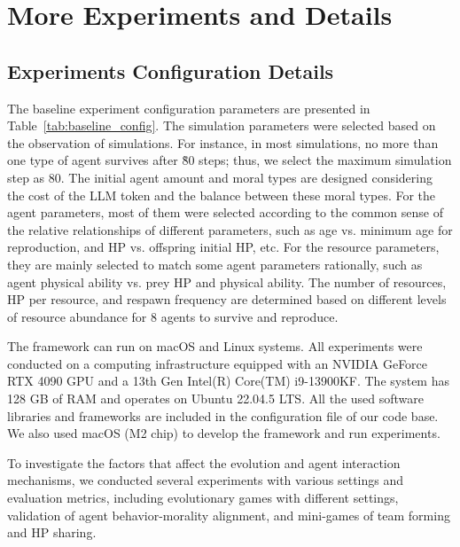 \section{More Experiments and Details}

\subsection{Experiments Configuration Details}

The baseline experiment configuration parameters are presented in Table~\ref{tab:baseline_config}. The simulation parameters were selected based on the observation of simulations. For instance, in most simulations, no more than one type of agent survives after \~80 steps; thus, we select the maximum simulation step as 80. The initial agent amount and moral types are designed considering the cost of the LLM token and the balance between these moral types. For the agent parameters, most of them were selected according to the common sense of the relative relationships of different parameters, such as age vs. minimum age for reproduction, and HP vs. offspring initial HP, etc. For the resource parameters, they are mainly selected to match some agent parameters rationally, such as agent physical ability vs. prey HP and physical ability. The number of resources, HP per resource, and respawn frequency are determined based on different levels of resource abundance for 8 agents to survive and reproduce.

The framework can run on macOS and Linux systems. All experiments were conducted on a computing infrastructure equipped with an NVIDIA GeForce RTX 4090 GPU and a 13th Gen Intel(R) Core(TM) i9-13900KF. The system has 128 GB of RAM and operates on Ubuntu 22.04.5 LTS. All the used software libraries and frameworks are included in the configuration file of our code base. We also used macOS (M2 chip) to develop the framework and run experiments.

To investigate the factors that affect the evolution and agent interaction mechanisms, we conducted several experiments with various settings and evaluation metrics, including evolutionary games with different settings, validation of agent behavior-morality alignment, and mini-games of team forming and HP sharing. 

